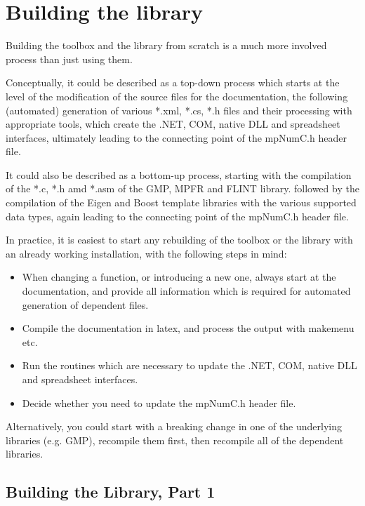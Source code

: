 	



\chapter{Building the library} 

Building the toolbox and the library from scratch is a much more involved process than just using them. 

Conceptually, it could be described as a top-down process which starts at the level of the modification of the source files for the documentation, the following (automated) generation of various *.xml, *.cs, *.h files and their processing with appropriate tools, which create the .NET, COM, native DLL and spreadsheet interfaces, ultimately leading to the connecting point of the mpNumC.h header file.

It could also be described as a bottom-up process, starting with the compilation of the *.c, *.h amd *.asm of the GMP, MPFR and FLINT library. followed by the compilation of the Eigen and Boost template libraries with the various supported data types, again leading  to the connecting point of the mpNumC.h header file.

In practice, it is easiest to start any rebuilding of the toolbox or the library with an already working installation, with the following steps in mind:

\begin{itemize}
	\item When changing a function, or introducing a new one, always start at the documentation, and provide all information which is required for automated generation of dependent files.
	\item Compile the documentation in latex, and process the output with makemenu etc.
	\item Run the routines which are necessary to update the .NET, COM, native DLL and spreadsheet interfaces.
	\item Decide whether you need to update the mpNumC.h header file.
\end{itemize}

Alternatively, you could start with a breaking change in one of the underlying libraries (e.g. GMP), recompile them first, then recompile all of the dependent libraries.




\newpage
\section{Building the Library, Part 1}

